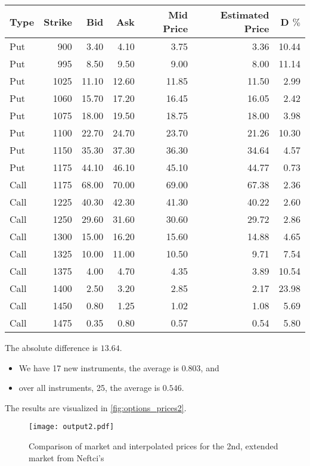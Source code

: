 \documentclass{article}
\begin{document}
\begin{tabular}{lrrrrrr}
    \toprule
    Type & Strike & Bid   & Ask   & Mid Price & Estimated Price & D $\%$ \\
    \midrule
    Put  & 900    & 3.40  & 4.10  & 3.75      & 3.36            & 10.44  \\
    Put  & 995    & 8.50  & 9.50  & 9.00      & 8.00            & 11.14  \\
    Put  & 1025   & 11.10 & 12.60 & 11.85     & 11.50           & 2.99   \\
    Put  & 1060   & 15.70 & 17.20 & 16.45     & 16.05           & 2.42   \\
    Put  & 1075   & 18.00 & 19.50 & 18.75     & 18.00           & 3.98   \\
    Put  & 1100   & 22.70 & 24.70 & 23.70     & 21.26           & 10.30  \\
    Put  & 1150   & 35.30 & 37.30 & 36.30     & 34.64           & 4.57   \\
    Put  & 1175   & 44.10 & 46.10 & 45.10     & 44.77           & 0.73   \\
    Call & 1175   & 68.00 & 70.00 & 69.00     & 67.38           & 2.36   \\
    Call & 1225   & 40.30 & 42.30 & 41.30     & 40.22           & 2.60   \\
    Call & 1250   & 29.60 & 31.60 & 30.60     & 29.72           & 2.86   \\
    Call & 1300   & 15.00 & 16.20 & 15.60     & 14.88           & 4.65   \\
    Call & 1325   & 10.00 & 11.00 & 10.50     & 9.71            & 7.54   \\
    Call & 1375   & 4.00  & 4.70  & 4.35      & 3.89            & 10.54  \\
    Call & 1400   & 2.50  & 3.20  & 2.85      & 2.17            & 23.98  \\
    Call & 1450   & 0.80  & 1.25  & 1.02      & 1.08            & 5.69   \\
    Call & 1475   & 0.35  & 0.80  & 0.57      & 0.54            & 5.80   \\
    \bottomrule
\end{tabular}





The absolute difference is $13.64$.
\begin{itemize}
    \item We have 17 new instruments, the average is $0.803$, and
    \item over all instruments, 25, the average is $0.546$.
\end{itemize}


The results are visualized in \autoref{fig:options_prices2}.


\begin{figure}[htbp]
    \centering
    \caption{Comparison of market and interpolated prices
        for the 2nd, extended market from Neftci's
        \label{fig:options_prices2}}
    \texttt{[image: output2.pdf]}
\end{figure}
\end{document}
